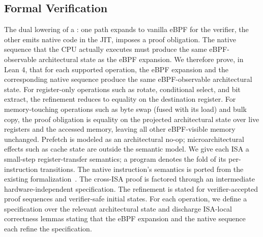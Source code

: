 \subsection{Formal Verification}
\label{sec:formal-verification}
The dual lowering of a \lang: one path expands to vanilla eBPF for the verifier, the other emits native code in the JIT, imposes a proof obligation.
The native sequence that the CPU actually executes must produce the same eBPF-observable architectural state as the eBPF expansion.
We therefore prove, in Lean 4, that for each supported \lang operation, the eBPF expansion and the corresponding native sequence produce the same eBPF-observable architectural state.
For register-only operations such as rotate, conditional select, and bit extract, the refinement reduces to equality on the destination register.
For memory-touching operations such as byte swap (fused with its load) and bulk copy, the proof obligation is equality on the projected architectural state over live registers and the accessed memory, leaving all other eBPF-visible memory unchanged.
Prefetch is modeled as an architectural no-op; microarchitectural effects such as cache state are outside the semantic model.
We give each ISA a small-step register-transfer semantics; a program denotes the fold of its per-instruction transitions.
The native instruction’s semantics is ported from the existing formalization~\cite{lnsym}.
The cross-ISA proof is factored through an intermediate hardware-independent specification.
The refinement is stated for verifier-accepted proof sequences and verifier-safe initial states.
For each \lang operation, we define a specification over the relevant architectural state and discharge ISA-local correctness lemmas stating that the eBPF expansion and the native sequence each refine the specification.
